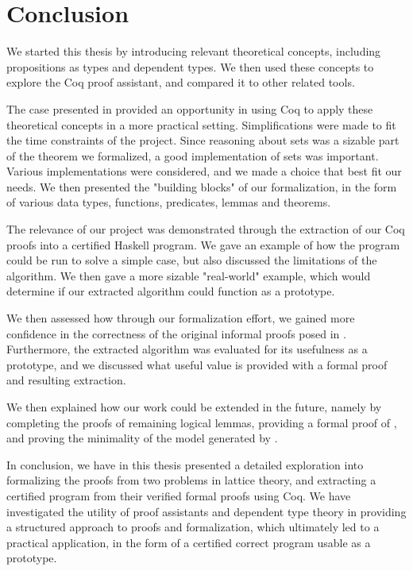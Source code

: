 \chapter{Conclusion}

We started this thesis by introducing relevant theoretical concepts,
including propositions as types and dependent types.
We then used these concepts to explore the Coq proof assistant,
and compared it to other related tools.

The case presented in 
provided an opportunity in using Coq to apply these theoretical concepts
in a more practical setting.
Simplifications were made to fit the time constraints of the project.
Since reasoning about sets was a sizable part of the theorem we formalized,
a good implementation of sets was important.
Various implementations were considered, and we made a choice that best fit our needs.
We then presented the "building blocks" of our formalization,
in the form of various data types, functions, predicates, lemmas and theorems.

The relevance of our project was demonstrated through the extraction
of our Coq proofs into a certified Haskell program.
We gave an example of how the program could be run to solve a simple case,
but also discussed the limitations of the algorithm.
We then gave a more sizable "real-world" example,
which would determine if our extracted algorithm could function as a prototype.

We then assessed how through our formalization effort,
we gained more confidence in the correctness of the original informal proofs posed in \cite{mbezem}.
Furthermore, the extracted algorithm was evaluated for its usefulness as a prototype,
and we discussed what useful value is provided with a formal proof and resulting extraction.

We then explained how our work could be extended in the future,
namely by completing the proofs of remaining logical lemmas,
providing a formal proof of , and proving the minimality of the model generated by .

In conclusion, we have in this thesis presented a detailed exploration into formalizing
the proofs from two problems in lattice theory,
and extracting a certified program from their verified formal proofs using Coq.
We have investigated the utility of proof assistants and dependent type theory
in providing a structured approach to proofs and formalization,
which ultimately led to a practical application,
in the form of a certified correct program usable as a prototype.
